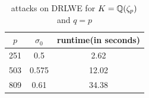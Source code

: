 \documentclass{amsart}
\begin{document}
\begin{table}[H]
\label{tab: ramified}
\caption{attacks on DRLWE for $K= \mathbb{Q}(\zeta_p)$ and $q = p$}
\begin{tabular}{c|c|c}
$p$ & $\sigma_0$ & runtime(in seconds) \\
\hline
251 & 0.5 & 2.62\\
503 & 0.575 & 12.02\\
809 & 0.61 & 34.38\\
\end{tabular}
\end{table}
















\end{document}
